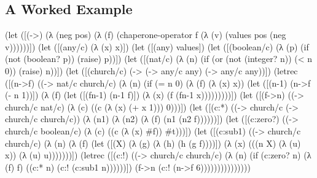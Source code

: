 \documentclass{sigplanconf}
\begin{document}
\subsection{A Worked Example}

\begin{schemedisplay}
(let ([(->) (λ (neg pos) (λ (f) (chaperone-operator f (λ (v) (values pos (neg v))))))])
  (let ([(any/c) (λ (x) x)])
    (let ([(any) values])
      (let ([(boolean/c) (λ (p)
                           (if (not (boolean? p))
                               (raise)
                               p))])
        (let ([(nat/c) (λ (n)
                         (if (or (not (integer? n))
                                 (< n 0))
                             (raise)
                             n))])
          (let ([(church/c) (-> (-> any/c any)
                                (-> any/c any))])
            (letrec ([(n->f) ((-> nat/c church/c)
                              (λ (n)
                                (if (= n 0)
                                    (λ (f) (λ (x) x))
                                    (let ([(n-1) (n->f (- n 1))])
                                      (λ (f)
                                        (let ([(fn-1) (n-1 f)])
                                          (λ (x) (f (fn-1 x)))))))))])
              (let ([(f->n) ((-> church/c nat/c)
                             (λ (c)
                               ((c (λ (x) (+ x 1))) 0)))])
                (let ([(c:*) ((-> church/c (-> church/c church/c))
                              (λ (n1)
                                (λ (n2)
                                  (λ (f)
                                    (n1 (n2 f))))))])
                  (let ([(c:zero?) ((-> church/c boolean/c)
                                    (λ (c) ((c (λ (x) #f)) #t)))])
                    (let ([(c:sub1) ((-> church/c church/c)
                                     (λ (n)
                                       (λ (f)
                                         (let ([(X) (λ (g) (λ (h) (h (g f))))])
                                           (λ (x)
                                             (((n X)
                                               (λ (u) x))
                                              (λ (u) u)))))))])
                      (letrec ([(c:!) ((-> church/c church/c)
                                       (λ (n)
                                         (if (c:zero? n)
                                             (λ (f) f)
                                             ((c:* n) (c:! (c:sub1 n))))))])
                        (f->n (c:! (n->f 6)))))))))))))))
\end{schemedisplay}
\end{document}
